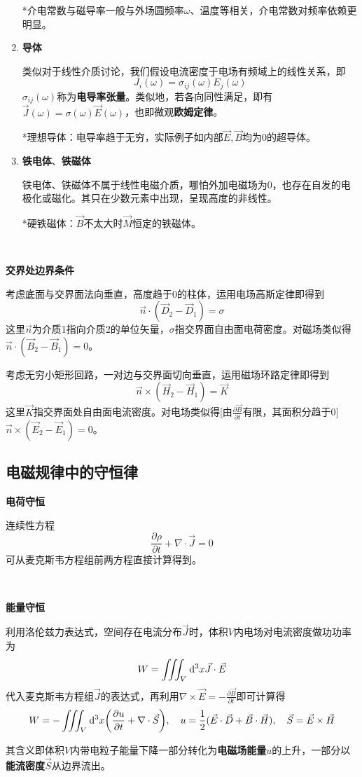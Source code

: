 \documentclass[a4paper,UTF8,fontset=windows]{ctexart}
\newcommand*{\dr}{\hspace{0.07em}\mathrm{d}}
\newcommand*{\vb}{\vec{B}}
\newcommand*{\vd}{\vec{D}}
\newcommand*{\ve}{\vec{E}}
\newcommand*{\vh}{\vec{H}}
\newcommand*{\vj}{\vec{J}}
\newcommand*{\vk}{\vec{K}}
\newcommand*{\vm}{\vec{M}}
\newcommand*{\vs}{\vec{S}}
\newcommand*{\vns}{\vec{n}}
\newcommand*{\pt}[2][t]{\frac{\partial #2}{\partial #1}}
\begin{document}
\begin{enumerate}
    *介电常数与磁导率一般与外场圆频率$\omega$、温度等相关，介电常数对频率依赖更明显。

    \item \textbf{导体}

    类似对于线性介质讨论，我们假设电流密度于电场有频域上的线性关系，即
    $$J_i(\omega)=\sigma_{ij}(\omega)E_j(\omega)$$
    $\sigma_{ij}(\omega)$称为\textbf{电导率张量}。类似地，若各向同性满足，即有$\vj(\omega)=\sigma(\omega)\ve(\omega)$，也即微观\textbf{欧姆定律}。

    *理想导体：电导率趋于无穷，实际例子如内部$\ve,\vb$均为0的超导体。

    \item \textbf{铁电体}、\textbf{铁磁体}
    
    铁电体、铁磁体不属于线性电磁介质，哪怕外加电磁场为0，也存在自发的电极化或磁化。其只在少数元素中出现，呈现高度的非线性。

    *硬铁磁体：$\vb$不太大时$\vm$恒定的铁磁体。
\end{enumerate}

\

\textbf{交界处边界条件}

考虑底面与交界面法向垂直，高度趋于0的柱体，运用电场高斯定律即得到
$$\vns\cdot(\vd_2-\vd_1)=\sigma$$
这里$\vns$为介质1指向介质2的单位矢量，$\sigma$指交界面自由面电荷密度。对磁场类似得$\vns\cdot(\vb_2-\vb_1)=0$。

考虑无穷小矩形回路，一对边与交界面切向垂直，运用磁场环路定律即得到
$$\vns\times(\vh_2-\vh_1)=\vk$$
这里$\vk$指交界面处自由面电流密度。对电场类似得[由$\pt{\vb}$有限，其面积分趋于0]\ $\vns\times(\ve_2-\ve_1)=0$。

\subsection{电磁规律中的守恒律}
\textbf{电荷守恒}

连续性方程
$$\pt{\rho}+\nabla\cdot\vj=0$$
可从麦克斯韦方程组前两方程直接计算得到。

\

\textbf{能量守恒}

利用洛伦兹力表达式，空间存在电流分布$\vj$时，体积$V$内电场对电流密度做功功率为
$$W=\iiint_V\dr^3x\vj\cdot\ve$$
代入麦克斯韦方程组$\vj$的表达式，再利用$\nabla\times\ve=-\pt{\vb}$即可计算得
$$W=-\iiint_V\dr^3x\bigg(\pt{u}+\nabla\cdot\vs\bigg),\quad u=\frac{1}{2}(\ve\cdot\vd+\vb\cdot\vh),\quad\vs=\ve\times\vh$$

其含义即体积$V$内带电粒子能量下降一部分转化为\textbf{电磁场能量}$u$的上升，一部分以\textbf{能流密度}$\vs$从边界流出。
\end{document}
